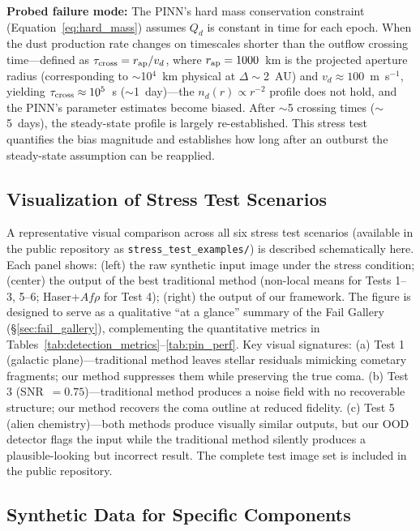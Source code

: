 \documentclass[usenatbib]{mnras}
\begin{document}
\textbf{Probed failure mode:} The PINN's hard mass conservation constraint (Equation~\ref{eq:hard_mass}) assumes $Q_d$ is constant in time for each epoch. When the dust production rate changes on timescales shorter than the outflow crossing time---defined as $\tau_{\rm cross} = r_{\rm ap} / v_d$, where $r_{\rm ap}=1000$~km is the projected aperture radius (corresponding to $\sim$10$^4$~km physical at $\Delta\sim$2~AU) and $v_d\approx100$~m~s$^{-1}$, yielding $\tau_{\rm cross} \approx 10^5$~s ($\sim$1~day)---the $n_d(r) \propto r^{-2}$ profile does not hold, and the PINN's parameter estimates become biased. After $\sim$5 crossing times ($\sim$5~days), the steady-state profile is largely re-established. This stress test quantifies the bias magnitude and establishes how long after an outburst the steady-state assumption can be reapplied.

\subsection{Visualization of Stress Test Scenarios}

A representative visual comparison across all six stress test scenarios (available in the public repository as \texttt{stress\_test\_examples/}) is described schematically here. Each panel shows: (left) the raw synthetic input image under the stress condition; (center) the output of the best traditional method (non-local means for Tests 1--3, 5--6; Haser+$Af\rho$ for Test 4); (right) the output of our framework. The figure is designed to serve as a qualitative ``at a glance'' summary of the Fail Gallery (\S\ref{sec:fail_gallery}), complementing the quantitative metrics in Tables~\ref{tab:detection_metrics}--\ref{tab:pin_perf}. Key visual signatures: (a) Test 1 (galactic plane)---traditional method leaves stellar residuals mimicking cometary fragments; our method suppresses them while preserving the true coma. (b) Test 3 (SNR~$=0.75$)---traditional method produces a noise field with no recoverable structure; our method recovers the coma outline at reduced fidelity. (c) Test 5 (alien chemistry)---both methods produce visually similar outputs, but our OOD detector flags the input while the traditional method silently produces a plausible-looking but incorrect result. The complete test image set is included in the public repository.

\subsection{Synthetic Data for Specific Components}
\end{document}
